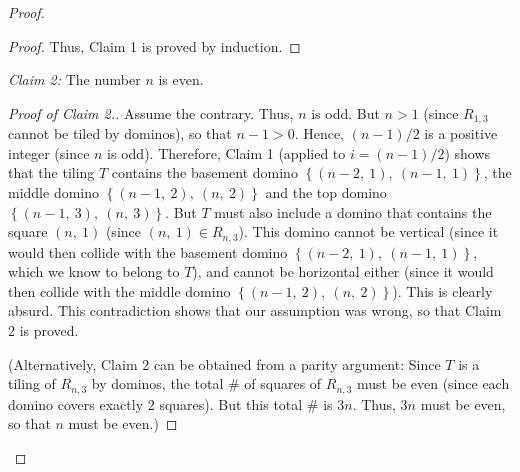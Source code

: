 \begin{fineprint}
\begin{proof}
\begin{proof}
Thus, Claim 1 is proved by induction.
\end{proof}

\begin{statement}
\textit{Claim 2:} The number $n$ is even.
\end{statement}

\begin{proof}
[Proof of Claim 2.]Assume the contrary. Thus, $n$ is odd. But $n>1$ (since
$R_{1,3}$ cannot be tiled by dominos), so that $n-1>0$. Hence, $\left(
n-1\right)  /2$ is a positive integer (since $n$ is odd). Therefore, Claim 1
(applied to $i=\left(  n-1\right)  /2$) shows that the tiling $T$ contains the
basement domino $\left\{  \left(  n-2,\ 1\right)  ,\ \left(  n-1,\ 1\right)
\right\}  $, the middle domino $\left\{  \left(  n-1,\ 2\right)  ,\ \left(
n,\ 2\right)  \right\}  $ and the top domino $\left\{  \left(  n-1,\ 3\right)
,\ \left(  n,\ 3\right)  \right\}  $. But $T$ must also include a domino that
contains the square $\left(  n,\ 1\right)  $ (since $\left(  n,\ 1\right)  \in
R_{n,3}$). This domino cannot be vertical (since it would then collide with
the basement domino $\left\{  \left(  n-2,\ 1\right)  ,\ \left(
n-1,\ 1\right)  \right\}  $, which we know to belong to $T$), and cannot be
horizontal either (since it would then collide with the middle domino
$\left\{  \left(  n-1,\ 2\right)  ,\ \left(  n,\ 2\right)  \right\}  $). This
is clearly absurd. This contradiction shows that our assumption was wrong, so
that Claim 2 is proved.

(Alternatively, Claim 2 can be obtained from a parity argument: Since $T$ is a
tiling of $R_{n,3}$ by dominos, the total \# of squares of $R_{n,3}$ must be
even (since each domino covers exactly $2$ squares). But this total \# is
$3n$. Thus, $3n$ must be even, so that $n$ must be even.)
\end{proof}


\end{proof}
\end{fineprint}
